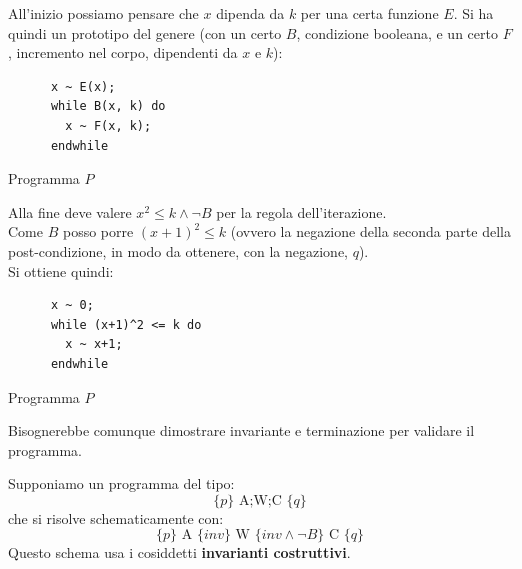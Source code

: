 \begin{esempio}
				      					      				All'inizio possiamo pensare che $x$ dipenda da $k$ per una certa funzione $E$.
				      					      				Si ha quindi un prototipo del genere (con un certo $B$, condizione booleana, e
				      					      				un certo $F$, incremento nel corpo, dipendenti da $x$ e $k$):
				      					      				\begin{listing}[H]
				      					      					\begin{lstlisting}
      x ~ E(x);
      while B(x, k) do
        x ~ F(x, k);
      endwhile  
				      					      					\end{lstlisting}
				      					      					\caption{Programma $P$}
				      					      				\end{listing}
				      					      				Alla fine deve valere $x^2\leq k \land \neg B$ per la regola
				      					      				dell'iterazione.\\
				      					      				Come $B$ posso porre $(x+1)^2\leq k$ (ovvero la negazione della seconda parte
				      					      				della post-condizione, in modo da ottenere, con la negazione, $q$).\\ Si
				      					      				ottiene quindi: 
				      					      				\begin{listing}[H]
				      					      					\begin{lstlisting}
      x ~ 0;
      while (x+1)^2 <= k do
        x ~ x+1;
      endwhile  
				      					      					\end{lstlisting}
				      					      					\caption{Programma $P$}
				      					      				\end{listing}
				      					      				Bisognerebbe comunque dimostrare invariante e terminazione per validare il
				      					      				programma. 
				      					      			\end{esempio}
				      					      			Supponiamo un programma del tipo:
				      					      			\[\{p\}\mbox{ A;W;C } \{q\}\]
				      					      			che si risolve schematicamente con:
				      					      			\[\{p\}\mbox{ A } \{inv\} \mbox{ W } \{inv\land \neg B\}\mbox{ C }\{q\}\]
				      					      			Questo schema usa i cosiddetti \textbf{invarianti costruttivi}.\\
